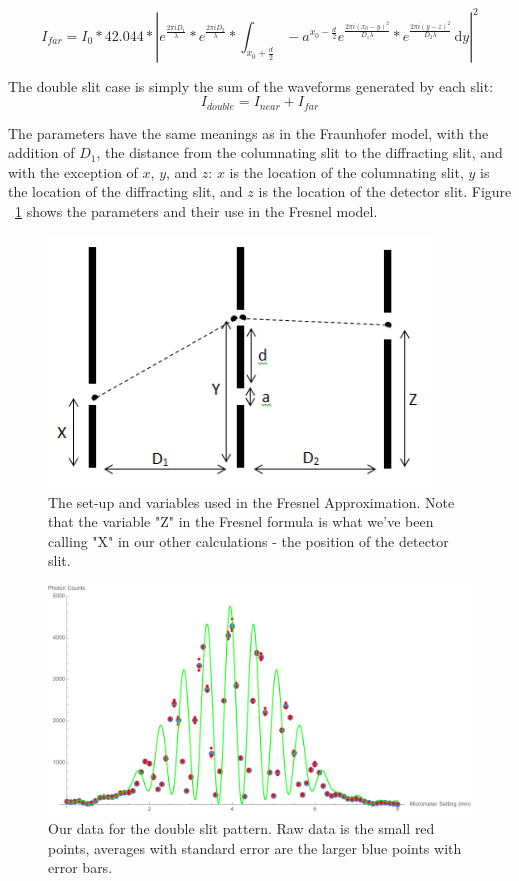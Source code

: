 \documentclass[prb,preprint]{revtex4-1}
\begin{document}
\begin{equation}
I_{far}=I_{0}*42.044*|e^{\frac{2 \pi i D_{1}}{\lambda}}*e^{\frac{2 \pi i D_{2}}{\lambda}}*\int_{x_{0}+\frac{d}{2}}-a^{x_{0}-\frac{d}{2}} \! e^{\frac{2 \pi i (x_{0}-y)^{2}}{D_{1} \lambda}}*e^{\frac{2 \pi i (y-z)^{2}}{D_{2} \lambda}} \, \mathrm{d}y |^{2}
\end{equation}

The double slit case is simply the sum of the waveforms generated by each slit: 
\begin{equation}
I_{double}=I_{near}+I_{far}
\end{equation}

The parameters have the same meanings as in the Fraunhofer model, with the addition of $D_1$, the distance from the columnating slit to the diffracting slit, and with the exception of $x$, $y$, and $z$: $x$ is the location of the columnating slit, $y$ is the location of the diffracting slit, and $z$ is the location of the detector slit.  Figure ~\ref{Fresnel_diagram} shows the parameters and their use in the Fresnel model.  

\begin{figure}[h!]
\centering
\includegraphics[width=4in]{Fresnel_diagram.png}
\caption{The set-up and variables used in the Fresnel Approximation. Note that the variable "Z" in the Fresnel formula is what we've been calling "X" in our other calculations - the position of the detector slit.}
\label{Fresnel_diagram}
\end{figure}

\begin{figure}[h!]
\centering
\includegraphics[width=6in]{double_slit_Fresnel_plot.pdf}
\caption{Our data for the double slit pattern.  Raw data is the small red points, averages with standard error are the larger blue points with error bars. }
\label{double_slit_Fresnel_plot}
\end{figure}
\end{document}
